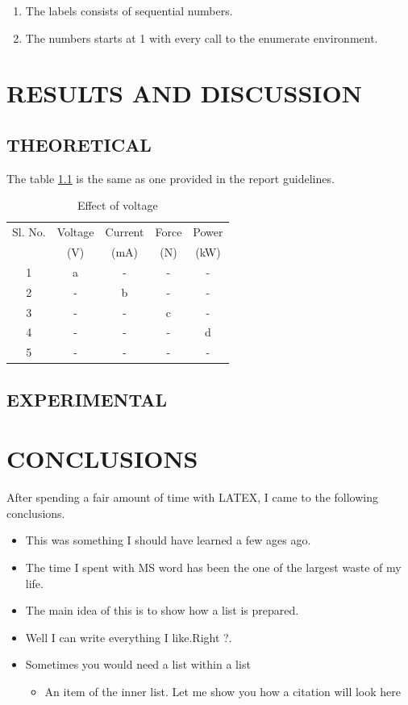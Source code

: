 \documentclass[12pt,a4paper]{report}
\begin{document}
\begin{enumerate}
  \item The labels consists of sequential numbers.
  \item The numbers starts at 1 with every call to the enumerate environment.
\end{enumerate}


\chapter{\MakeUppercase{{Results and Discussion}}}
\lipsum[1]
\section{THEORETICAL}
\lipsum[1]The table \ref{table:1} is the same as one provided in the report guidelines. \\
 
\begin{table}[h!]
\centering
\caption{Effect of voltage}
\begin{tabular}{|c | c c | c c|} 
 \hline
 Sl. No. & Voltage & Current & Force & Power \\
  & (V) & (mA) & (N) & (kW) \\
 \hline
 1 & a & - & - & -  \\ 
 2 & - & b & - & - \\
 3 & - & - & c & - \\
 4 & - & - & - & d \\
 \hline
 5 & - & - & - & - \\ 
 \hline
\end{tabular}

\label{table:1}
\end{table}
\section{EXPERIMENTAL}
\lipsum[1]
\chapter{CONCLUSIONS}

After spending a fair amount of time with LATEX, I came to the following conclusions.
\begin{itemize}
  \item This was something I should have learned a few ages ago.
  \item The time I spent with MS word has been the one of the largest waste of my life.
  \item The main idea of this is to show  how a list is prepared.
  \item Well I can write everything I like.Right ?. 
  \item Sometimes you would need a list within a list
  	\begin{itemize}
  		\item An item of the inner list. Let me show you how a citation will look here \cite{grasham1952}
  	\end{itemize}
\end{itemize}
\end{document}
